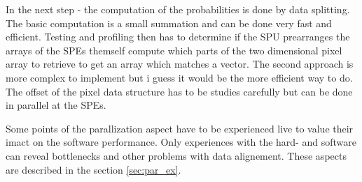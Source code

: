 In the next step - the computation of the probabilities is done by data splitting. The basic computation is a small summation and can be done very fast and efficient. Testing and profiling then has to determine if the SPU prearranges the arrays of the SPEs themself compute which parts of the two dimensional pixel array to retrieve to get an array which matches a vector. The second approach is more complex to implement but i guess it would be the more efficient way to do. The offset of the pixel data structure has to be studies carefully but can be done in parallel at the SPEs.

Some points of the parallization aspect have to be experienced live to value their imact on the software performance. Only experiences with the hard- and software can reveal bottlenecks and other problems with data alignement. These aspects are described in the section \ref{sec:par_ex}.





